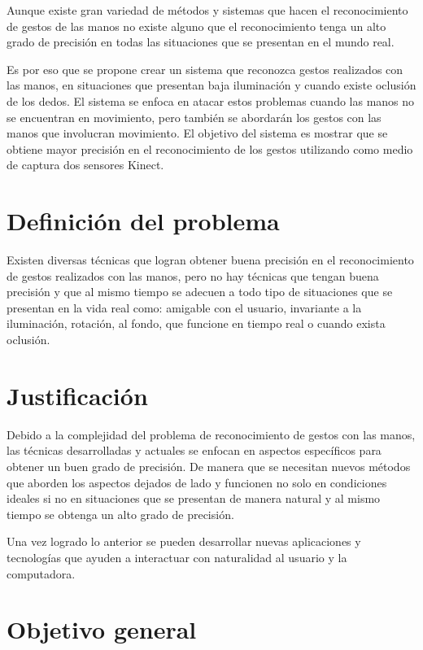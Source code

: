 Aunque existe gran variedad de métodos y sistemas que hacen el reconocimiento de gestos de las manos no existe alguno que el reconocimiento tenga un alto grado de precisión en todas las situaciones que se presentan en el mundo real.  

Es por eso que se propone crear un sistema que reconozca gestos realizados con las manos, en situaciones que presentan baja iluminación y cuando existe oclusión de los dedos. 
El sistema se enfoca en atacar estos problemas cuando las manos no se encuentran en movimiento, pero también se abordar\'an los gestos con las manos que involucran movimiento. El objetivo del sistema es mostrar que se obtiene mayor precisión en el reconocimiento de los gestos utilizando como medio de captura dos sensores Kinect.   



\section{Definici\'on del problema}\label{sec:DefinicionProblema}

Existen diversas técnicas que logran obtener buena precisión en el reconocimiento de gestos realizados con las manos, pero no hay técnicas que tengan buena precisión y que al mismo tiempo se adecuen a todo tipo de situaciones que se presentan en la vida real como: amigable con el usuario, invariante a la iluminación, rotación, al fondo, que funcione en tiempo real o cuando exista oclusión.



\section{Justificaci\'on}\label{sec:Just}

Debido a la complejidad del problema de reconocimiento de gestos con las manos, las técnicas desarrolladas y actuales se enfocan en aspectos específicos para obtener un buen grado de precisión. De manera que se necesitan nuevos métodos que aborden los aspectos dejados de lado y funcionen no solo en condiciones ideales si no en situaciones que se presentan de manera natural y al mismo tiempo se obtenga un alto grado de precisión.  

Una vez logrado lo anterior se pueden desarrollar nuevas aplicaciones y tecnologías que ayuden a interactuar con naturalidad al usuario y la computadora.



\section{Objetivo general}\label{sec:ObjetivoGeneral}
 
